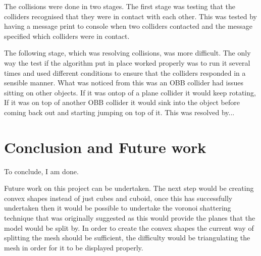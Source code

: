 \documentclass[conference,backref=page]{acmsiggraph}
\begin{document}
The collisions were done in two stages. The first stage was testing that the colliders recognised that they were in contact with each other. This was tested by having a message print to console when two colliders contacted and the message specified which colliders were in contact. 

The following stage, which was resolving collisions, was more difficult. The only way the test if the algorithm put in place worked properly was to run it several times and used different conditions to ensure that the colliders responded in a sensible manner. What was noticed from this was an OBB collider had issues sitting on other objects. If it was ontop of a plane collider it would keep rotating, If it was on top of another OBB collider it would sink into the object before coming back out and starting jumping on top of it. This was resolved by...   


\section{Conclusion and Future work}
To conclude, I am done.

Future work on this project can be undertaken. The next step would be creating convex shapes instead of just cubes and cuboid, once this has successfully undertaken then it would be possible to undertake the voronoi shattering technique that was originally suggested as this would provide the planes that the model would be split by. In order to create the convex shapes the current way of splitting the mesh should be sufficient, the difficulty would be triangulating the mesh in order for it to be displayed properly.






\end{document}
